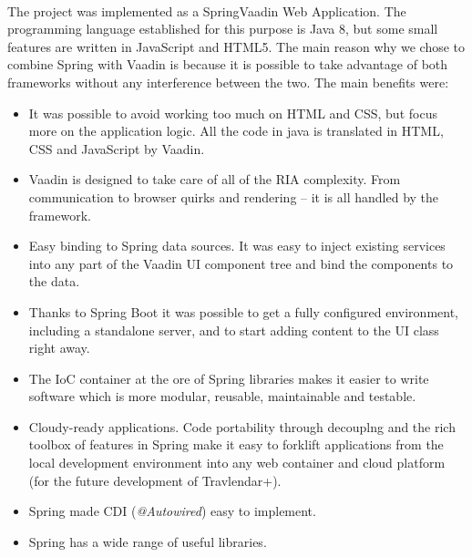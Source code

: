 \documentclass{article}
\begin{document}
		\paragraph{}The project was implemented as a SpringVaadin Web Application. The programming language established for this purpose is Java 8, but some small features are written in JavaScript and HTML5.  The main reason why we chose to combine Spring with Vaadin is because it is possible to take advantage of both frameworks without any interference between the two. The main benefits were:
\begin{itemize}
\item{}It was possible to avoid working too much on HTML and CSS, but focus more on the application logic. All the code in java is translated in HTML, CSS and JavaScript by Vaadin.
\item{}Vaadin is designed to take care of all of the RIA complexity. From communication to browser quirks and rendering – it is all handled by the framework.
\item{}Easy binding to Spring data sources. It was easy to inject existing services into any part of the Vaadin UI component tree and bind the components to the data.
\item{}Thanks to Spring Boot it was possible to get a fully configured environment, including a standalone server, and to start adding content to the UI class right away.
\item{} The IoC container at the ore of Spring libraries makes it easier to write software which is more modular, reusable, maintainable and testable.
\item{}Cloudy-ready applications. Code portability through decouplng and the rich toolbox of features in Spring make it easy to forklift applications from the local development environment into any web container and cloud platform (for the future development of Travlendar+).
\item{}Spring made CDI (\textit{@Autowired}) easy to implement.
\item{}Spring has a wide range of useful libraries.
\end{itemize}
\end{document}
